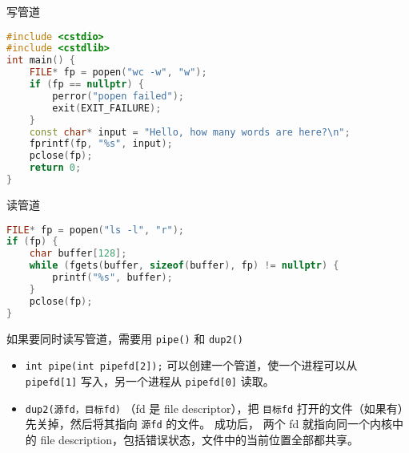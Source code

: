 写管道
\begin{lstlisting}[language=cpp]
#include <cstdio>
#include <cstdlib>
int main() {
    FILE* fp = popen("wc -w", "w");
    if (fp == nullptr) {
        perror("popen failed");
        exit(EXIT_FAILURE);
    }
    const char* input = "Hello, how many words are here?\n";
    fprintf(fp, "%s", input);
    pclose(fp);
    return 0;
}
\end{lstlisting}
读管道
\begin{lstlisting}[language=cpp]
FILE* fp = popen("ls -l", "r");
if (fp) {
    char buffer[128];
    while (fgets(buffer, sizeof(buffer), fp) != nullptr) {
        printf("%s", buffer);
    }
    pclose(fp);
}
\end{lstlisting}

如果要同时读写管道，需要用 \verb`pipe()` 和 \verb`dup2()`
\begin{itemize}
\item \verb`int pipe(int pipefd[2]);` 可以创建一个管道，使一个进程可以从 \verb`pipefd[1]` 写入，另一个进程从 \verb`pipefd[0]` 读取。
\item \verb`dup2(源fd，目标fd)` （fd 是 file descriptor），把 \verb`目标fd` 打开的文件（如果有）先关掉，然后将其指向 \verb`源fd` 的文件。 成功后， 两个 fd 就指向同一个内核中的 file description，包括错误状态，文件中的当前位置全部都共享。 
\end{itemize}

